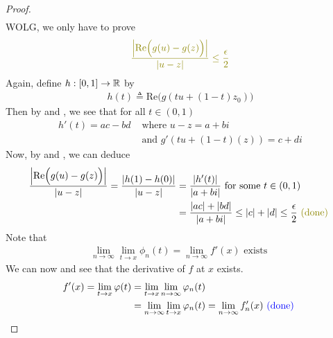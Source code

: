 \documentclass{report}
\begin{document}
\begin{proof}
\begin{align*}
\end{align*}
WOLG, we only have to prove 
\begin{align*}
\olive{\frac{\abso{\text{Re}\Big(g(u)-g(z) \Big)}}{\abso{u-z}}\leq \frac{\epsilon}{2}}
\end{align*}
Again, define $h:[0,1]\rightarrow \mathbb{R}$ by 
\begin{align*}
h(t)\triangleq \text{Re}\Big(g(tu+(1-t)z_0) \Big)
\end{align*}
Then by  and , we see that for all $t\in (0,1)$ 
\begin{align*}
  h'(t)= ac-bd&\text{ where }u-z=a+b i \\
&\text{ and } g'(tu+(1-t)(z))=c+di
\end{align*}
Now, by  and , we can deduce 
\begin{align*}
  \frac{\abso{\text{Re}\Big(g(u)-g(z) \Big)}}{\abso{u-z}}=\frac{\abso{h(1)-h(0)}}{\abso{u-z}}&=\frac{\abso{h'(t)}}{\abso{a+b i}}\text{ for some }t \in (0,1)\\
&= \frac{\abso{ac}+\abso{bd}}{\abso{a+b i}}\leq \abso{c}+\abso{d}\leq \frac{\epsilon}{2} \odone
\end{align*}
Note that 
\begin{align*}
\lim_{n\to \infty}\lim_{t\to x}\phi_n(t)=\lim_{n\to \infty}f'(x)\text{ exists }
\end{align*}
We can now  and see that the derivative of $f$ at $x$ exists. 
\begin{align*}
f'(x)=\lim_{t\to x}\varphi (t)&=\lim_{t\to x}\lim_{n\to \infty}\varphi_n(t)\\
&=\lim_{n\to \infty}\lim_{t\to x}\varphi_n(t)=\lim_{n\to \infty}f'_n(x) \textcolor{blue}{\text{ (done) }}
\end{align*}
\end{proof}
\end{document}
